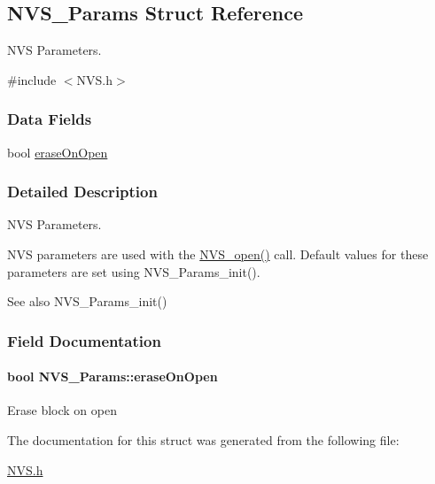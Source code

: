 \subsection{N\+V\+S\+\_\+\+Params Struct Reference}
\label{struct_n_v_s___params}


N\+V\+S Parameters.  




{\ttfamily \#include $<$N\+V\+S.\+h$>$}

\subsubsection*{Data Fields}
\begin{DoxyCompactItemize}
\item 
bool \hyperlink{struct_n_v_s___params_a74b08071a9721fb3fb529c88f920c54f}{erase\+On\+Open}
\end{DoxyCompactItemize}


\subsubsection{Detailed Description}
N\+V\+S Parameters. 

N\+V\+S parameters are used with the \hyperlink{_n_v_s_8h_ad3a3d1f1477312eeee6d2c907a25bd67}{N\+V\+S\+\_\+open()} call. Default values for these parameters are set using N\+V\+S\+\_\+\+Params\+\_\+init().

\begin{DoxySeeAlso}{See also}
N\+V\+S\+\_\+\+Params\+\_\+init() 
\end{DoxySeeAlso}


\subsubsection{Field Documentation}
\paragraph[{erase\+On\+Open}]{\setlength{\rightskip}{0pt plus 5cm}bool N\+V\+S\+\_\+\+Params\+::erase\+On\+Open}\label{struct_n_v_s___params_a74b08071a9721fb3fb529c88f920c54f}
Erase block on open 

The documentation for this struct was generated from the following file\+:\begin{DoxyCompactItemize}
\item 
\hyperlink{_n_v_s_8h}{N\+V\+S.\+h}\end{DoxyCompactItemize}

